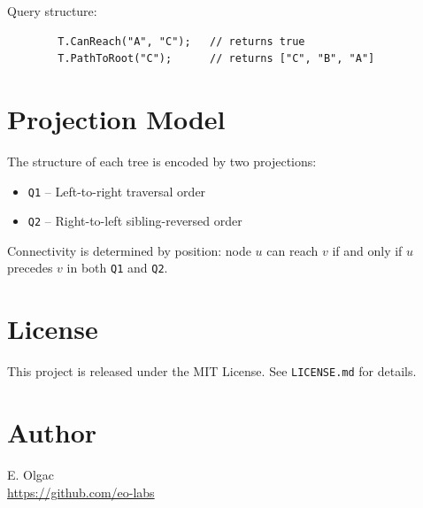\documentclass[11pt]{article}
\begin{document}
	Query structure:
	\begin{verbatim}
		T.CanReach("A", "C");   // returns true
		T.PathToRoot("C");      // returns ["C", "B", "A"]
	\end{verbatim}
	
	\section*{Projection Model}
	
	The structure of each tree is encoded by two projections:
	\begin{itemize}
		\item \texttt{Q1} -- Left-to-right traversal order
		\item \texttt{Q2} -- Right-to-left sibling-reversed order
	\end{itemize}
	
	Connectivity is determined by position: node \( u \) can reach \( v \) if and only if \( u \) precedes \( v \) in both \texttt{Q1} and \texttt{Q2}.
	
	\section*{License}
	
	This project is released under the MIT License. See \texttt{LICENSE.md} for details.
	
	\section*{Author}
	
	E. Olgac \\
	\href{https://github.com/eo-labs}{https://github.com/eo-labs}
	
\end{document}
